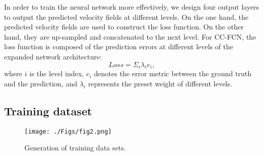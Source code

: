 \documentclass[%
 aip,
 amsmath,amssymb,
 reprint,%
]{revtex4-1}
\begin{document}
In order to train the neural network more effectively, we design four output layers to output the predicted velocity fields at different levels. 
On the one hand, the predicted velocity fields are used to construct the loss function. On the other hand, they are up-sampled and concatenated to the next level.
For CC-FCN, the loss function is composed of the prediction errors at different levels of the expanded network architecture:
\begin{equation}
Loss=\Sigma_{i}\lambda_{i}e_{i},
\label{eqn7}
\end{equation}
where $i$ is the level index, $e_{i}$ denotes the error metric between the ground truth and the prediction, and $\lambda_{i}$ represents the preset weight of different levels.


\subsection{Training dataset}
\label{sect3.2}

\begin{figure*}
\begin{center}
  \texttt{[image: ./Figs/fig2.png]}
\caption{Generation of training data sets.}
\label{fig2}   
\end{center}
\end{figure*}
\end{document}
